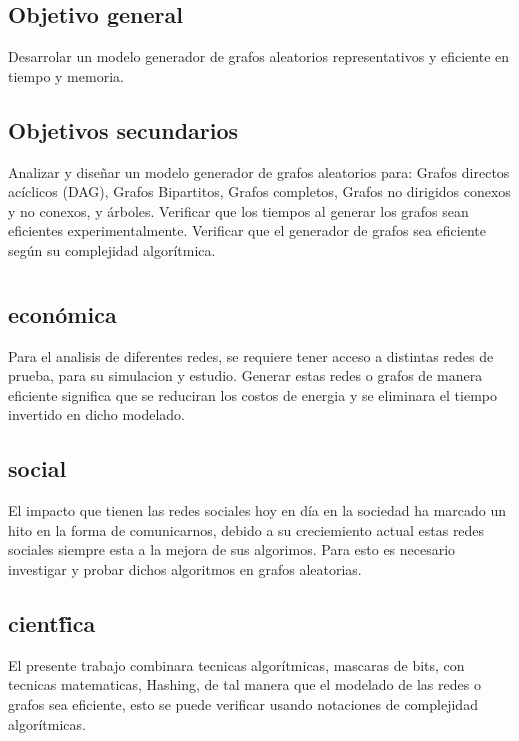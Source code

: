 \documentclass[11pt]{extarticle}
\begin{document}
  \subsection{Objetivo general}
  Desarrolar un modelo generador de grafos aleatorios representativos y eficiente en tiempo y memoria.
  \subsection{Objetivos secundarios}
      \begin{itemize}
        \guion Analizar y diseñar un modelo generador de grafos aleatorios para: Grafos directos acíclicos (DAG), Grafos Bipartitos, Grafos completos, Grafos no dirigidos conexos y no conexos, y árboles.
        \guion Verificar que los tiempos al generar los grafos sean eficientes experimentalmente.
        \guion Verificar que el generador de grafos sea eficiente según su complejidad algorítmica.
      \end{itemize}
\section{\justificacion}
  \subsection{\justificacion econ\'omica}
    Para el analisis de diferentes redes, se requiere tener acceso a distintas redes de prueba, para su simulacion y estudio.
    Generar  estas redes o grafos de manera eficiente significa que se reduciran los costos de energia y se
    eliminara el tiempo invertido en dicho modelado.
  \subsection{\justificacion social}
    El impacto que tienen las redes sociales hoy en d\'ia en la sociedad ha marcado un hito en la forma de comunicarnos,
    debido a su creciemiento actual estas redes sociales siempre esta a la mejora de sus algorimos.
    Para esto es necesario investigar y probar dichos algoritmos en grafos aleatorias.
  \subsection{\justificacion cient\'fica}
    El presente trabajo combinara tecnicas algor\'itmicas, mascaras de bits, con tecnicas
    matematicas, Hashing, de tal manera que el modelado de las redes o grafos sea eficiente,
    esto se puede verificar usando notaciones de complejidad algor\'itmicas.
\end{document}
